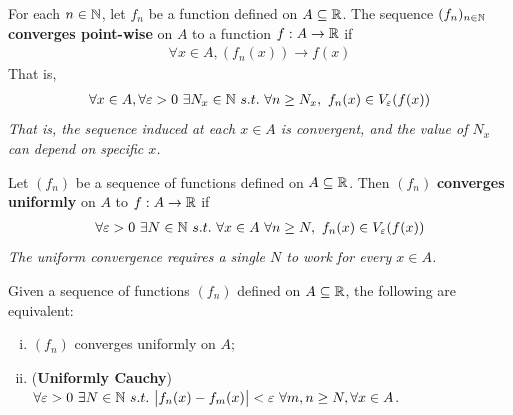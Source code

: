 \documentclass[11pt]{article}
\begin{document}
	\begin{definition}
		For each $n \in \mathbb{N}$, let $f_n$ be a function defined on $A \subseteq \mathbb{R}$. The sequence $(f_n)_{n \in \mathbb{N}}$ \textbf{converges point-wise} on $A$ to a function $f: A \to \mathbb{R}$ if
		\begin{align}
			\forall x \in A, (f_n(x)) \to f(x)
		\end{align}
		That is,
		\begin{align}
			\forall x \in A,\forall \varepsilon > 0\ \exists N_x \in \mathbb{N}\ s.t.\ \forall n \geq N_x,\ f_n(x) \in V_\varepsilon(f(x))
		\end{align}
		\emph{That is, the sequence induced at each $x \in A$ is convergent, and the value of $N_x$ can depend on specific $x$.}
	\end{definition}
	
	\begin{definition}
		Let $(f_n)$ be a sequence of functions defined on $A \subseteq \mathbb{R}$. Then $(f_n)$ \textbf{converges uniformly} on $A$ to $f: A \to \mathbb{R}$ if 
		\begin{align}
			\forall \varepsilon > 0\ \exists N \in \mathbb{N}\ s.t.\ \forall x \in A\ \forall n \geq N,\ f_n(x) \in V_\varepsilon(f(x))
		\end{align}
		\emph{The uniform convergence requires a single $N$ to work for every $x \in A$.}
	\end{definition}
	
	\begin{theorem}
		Given a sequence of functions $(f_n)$ defined on $A \subseteq \mathbb{R}$, the following are equivalent:
		\begin{enumerate}[(i)]
			\item $(f_n)$ converges uniformly on $A$;
			\item (\textbf{Uniformly Cauchy})$\forall \varepsilon > 0\ \exists N \in \N\ s.t.\ \abs{f_n(x) - f_m(x)} < \varepsilon\ \forall m, n \geq N, \forall x \in A$.
		\end{enumerate}
	\end{theorem}
	
\end{document}
